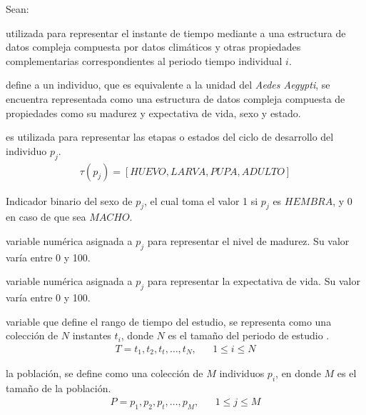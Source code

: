 Sean:
\begin{description}[style=multiline,leftmargin=1.5cm]
    \item[$t_{i}$] utilizada para representar el instante de tiempo mediante a una estructura de datos compleja
    compuesta por datos climáticos y otras propiedades complementarias correspondientes al periodo tiempo
    individual $i$.
    
    \item[$p_{i}$] define a un individuo, que es equivalente a la unidad del \textit{Aedes Aegypti}, se encuentra
    representada como una estructura de datos compleja compuesta de propiedades como su  madurez y expectativa de
    vida, sexo y estado.

    \item[$\tau(p_{j})$]  es utilizada para representar las etapas o estados del ciclo
    de desarrollo del individuo $p_{j}$.
    \begin{align*}
        \tau (p_{j}) = [HUEVO, LARVA, PUPA, ADULTO]
    \end{align*}

    \item[$S(p_{j})$]  Indicador binario del sexo de $p_{j}$, el cual toma el valor 1
    si $p_{j}$ es $HEMBRA$, y 0 en caso de que sea $MACHO$.

    \item[$\eta (p_{j})$]  variable numérica asignada a $p_{j}$ para representar el nivel
    de madurez. Su valor varía entre 0 y 100.
    
    \item[$\xi (p_{j})$]  variable numérica asignada a $p_{j}$ para representar la
    expectativa de vida. Su valor varía entre 0 y 100.
    
    \item[$T$] variable que define el rango de tiempo del estudio, se representa como una colección de $N$
    instantes $t_{i}$, donde $N$ es el tamaño del periodo de estudio .
        \begin{align*}
            T = t_1,t_2,t_t,\ldots,t_N , & & 1 \leq i \leq N
        \end{align*}

    \item[$P$] la población, se define como una colección de $M$ individuos $p_{i}$, en donde $M$ es el tamaño de
    la población.
    \begin{align*}
        P = p_1,p_2,p_t,\ldots,p_M,  & & 1 \leq j \leq M
    \end{align*}
    
\end{description}

